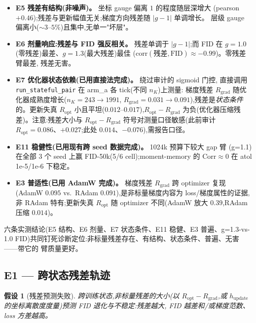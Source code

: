 \documentclass[UTF8,11pt,a4paper]{ctexart}
\newtheorem{hypothesis}{假设}[section]
\begin{document}
\begin{itemize}
  \item \textbf{E5 残差有结构(非噪声)。} 坐标 gauge 偏离 $1$ 的程度随层深增大
        (pearson $+0.46$);残差与更新幅值无关;梯度方向残差随 $|g-1|$ 单调增长。
        层级 gauge 偏离小($\sim3$--$5\%$)且集中,无单一"坏层"。
  \item \textbf{E6 剂量响应:残差与 FID 强反相关。} 残差单调于 $|g-1|$;而
        FID 在 $g{=}1.0$(零残差)最差、$g{=}1.3$(最大残差)最佳
        ($\mathrm{corr}(\text{残差},\text{FID})\approx -0.99$)。零残差臂最差,
        残差无害。
  \item \textbf{E7 优化器状态依赖(已用直接法完成)。} 绕过审计的 sigmoid 门控,
        直接调用 \texttt{run\_stateful\_pair} 在 arm\_a 各 tick(不同 $n_K$)上测量:
        梯度残差 $R_{\mathrm{grad}}$ 随优化器成熟度增长($n_K{=}243\to1991$,
        $R_{\mathrm{grad}}{=}0.031\to0.091$),残差是\emph{状态条件}的。更新失真
        $R_{\mathrm{opt}}$ 小且平坦($0.012$--$0.017$),$R_{\mathrm{opt}}-R_{\mathrm{grad}}$
        为负(优化器压缩残差)。注意:残差大小与 $R_{\mathrm{opt}}-R_{\mathrm{grad}}$
        符号对测量口径敏感(此前审计 $R_{\mathrm{opt}}{=}0.086$、$+0.027$;此处
        $0.014$、$-0.076$),需报告口径。
  \item \textbf{E11 稳健性(已用现有跨 seed 数据完成)。} 1024k 预算下较大 gap 臂
        (g=1.1)在全部 3 个 seed 上赢 FID-50k(5/6 cell);moment-memory 的
        $\mathrm{Corr}\approx 0$ 在 atol 1e-5/1e-6 下稳定。
  \item \textbf{E3 普适性(已用 AdamW 完成)。} 梯度残差 $R_{\mathrm{grad}}$ 跨
        optimizer 复现(AdamW $0.095$ vs.\ RAdam $0.091$),是非标量梯度内容为
        loss/梯度属性的证据,非 RAdam 特有;更新失真 $R_{\mathrm{opt}}$ 随
        optimizer 不同(AdamW 放大 $0.39$,RAdam 压缩 $0.014$)。
\end{itemize}

六条实测结论(E5 结构、E6 剂量、E7 状态条件、E11 稳健、E3 普遍、g=1.3-vs-1.0
FID)共同钉死诊断定位:非标量残差存在、有结构、状态条件、普遍、无害——带它的
臂质量更好。

\subsection{E1 --- 跨状态残差轨迹}
\begin{hypothesis}[残差预测失败]
\label{hyp:E1}
跨训练状态,非标量残差的大小(以 $R_{\mathrm{opt}}-R_{\mathrm{grad}}$,或
$h_{\mathrm{update}}$ 的坐标离散度度量)\emph{预测} FID 退化与不稳定:残差越大,
FID 越差和/或梯度范数、loss 方差越高。
\end{hypothesis}
\end{document}
